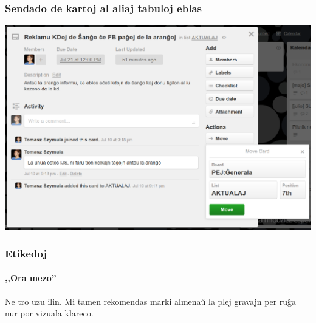   \begin{frame}
    \frametitle{Sendado de kartoj al aliaj tabuloj eblas}
	
	\begin{center}
		\includegraphics[scale=0.2]{ekranoj/movu-karton}
	\end{center}
	
  \end{frame}


  \begin{frame}
    \frametitle{Etikedoj}
	\framesubtitle{	,,Ora mezo''}
	
	Ne tro uzu ilin. Mi tamen rekomendas marki almenaŭ la plej gravajn per ruĝa nur por vizuala klareco.
	
  \end{frame}


